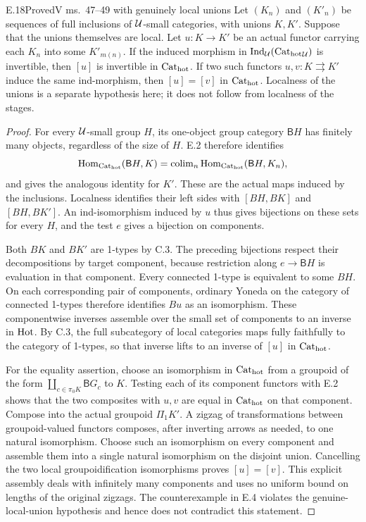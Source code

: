 \begin{claim}{E.18}{Proved}{V ms.~47--49 with genuinely local unions}
Let $(K_n)$ and $(K'_n)$ be sequences of full inclusions of $\mathcal U$-small categories, with unions $K,K'$. Suppose that the unions themselves are local. Let $u:K\to K'$ be an actual functor carrying each $K_n$ into some $K'_{m(n)}$. If the induced morphism in $\operatorname{Ind}_\mathcal U({\mathrm{Cat}_{\mathrm{hot}}}_\mathcal U)$ is invertible, then $[u]$ is invertible in ${\mathrm{Cat}_{\mathrm{hot}}}$. If two such functors $u,v:K\rightrightarrows K'$ induce the same ind-morphism, then $[u]=[v]$ in ${\mathrm{Cat}_{\mathrm{hot}}}$. Localness of the unions is a separate hypothesis here; it does not follow from localness of the stages.
\end{claim}
\begin{proof}
For every $\mathcal U$-small group $H$, its one-object group category $\mathsf BH$ has finitely many objects, regardless of the size of $H$. E.2 therefore identifies
\[
 \operatorname{Hom}_{{\mathrm{Cat}_{\mathrm{hot}}}}(\mathsf BH,K)
       =\operatorname{colim}_n\operatorname{Hom}_{{\mathrm{Cat}_{\mathrm{hot}}}}(\mathsf BH,K_n),
\]
and gives the analogous identity for $K'$. These are the actual maps induced by the inclusions. Localness identifies their left sides with $[BH,BK]$ and $[BH,BK']$. An ind-isomorphism induced by $u$ thus gives bijections on these sets for every $H$, and the test $e$ gives a bijection on components.

Both $BK$ and $BK'$ are 1-types by C.3. The preceding bijections respect their decompositions by target component, because restriction along $e\to\mathsf BH$ is evaluation in that component. Every connected 1-type is equivalent to some $BH$. On each corresponding pair of components, ordinary Yoneda on the category of connected 1-types therefore identifies $Bu$ as an isomorphism. These componentwise inverses assemble over the small set of components to an inverse in $\mathrm{Hot}$. By C.3, the full subcategory of local categories maps fully faithfully to the category of 1-types, so that inverse lifts to an inverse of $[u]$ in ${\mathrm{Cat}_{\mathrm{hot}}}$.

For the equality assertion, choose an isomorphism in ${\mathrm{Cat}_{\mathrm{hot}}}$ from a groupoid of the form $\coprod_{c\in\pi_0K}\mathsf BG_c$ to $K$. Testing each of its component functors with E.2 shows that the two composites with $u,v$ are equal in ${\mathrm{Cat}_{\mathrm{hot}}}$ on that component. Compose into the actual groupoid $\Pi_1K'$. A zigzag of transformations between groupoid-valued functors composes, after inverting arrows as needed, to one natural isomorphism. Choose such an isomorphism on every component and assemble them into a single natural isomorphism on the disjoint union. Cancelling the two local groupoidification isomorphisms proves $[u]=[v]$. This explicit assembly deals with infinitely many components and uses no uniform bound on lengths of the original zigzags. The counterexample in E.4 violates the genuine-local-union hypothesis and hence does not contradict this statement.
\end{proof}
